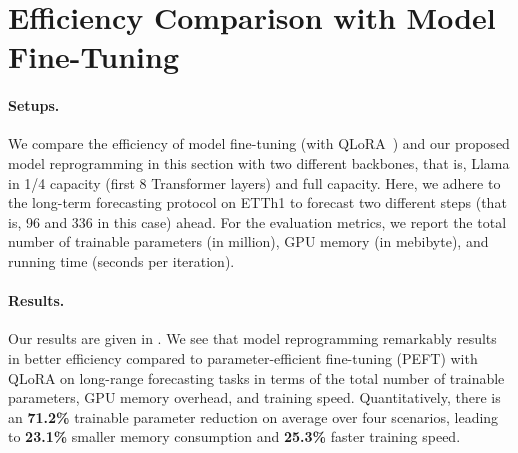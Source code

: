 \section{Efficiency Comparison with Model Fine-Tuning}


\paragraph{Setups.} We compare the efficiency of model fine-tuning (with QLoRA~\cite{dettmers2023qlora}) and our proposed model reprogramming in this section with two different backbones, that is, Llama in 1/4 capacity (first 8 Transformer layers) and full capacity. Here, we adhere to the long-term forecasting protocol on ETTh1 to forecast two different steps (that is, 96 and 336 in this case) ahead. For the evaluation metrics, we report the total number of trainable parameters (in million), GPU memory (in mebibyte), and running time (seconds per iteration).

\paragraph{Results.} Our results are given in . We see that model reprogramming remarkably results in better efficiency compared to parameter-efficient fine-tuning (PEFT) with QLoRA on long-range forecasting tasks in terms of the total number of trainable parameters, GPU memory overhead, and training speed. Quantitatively, there is an \textbf{71.2\%} trainable parameter reduction on average over four scenarios, leading to \textbf{23.1\%} smaller memory consumption and \textbf{25.3\%} faster training speed.

